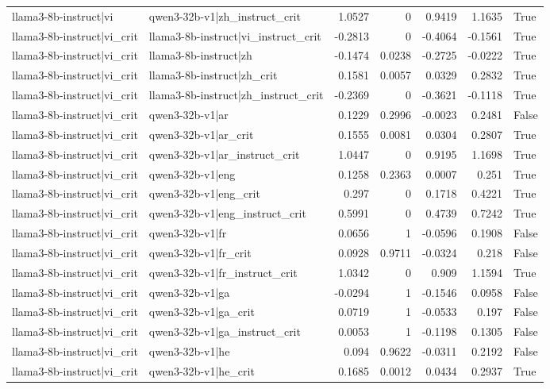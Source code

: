 \begin{table}
\begin{tabular}{l l r r r r l}
llama3-8b-instruct|vi & qwen3-32b-v1|zh_instruct_crit & 1.0527 & 0 & 0.9419 & 1.1635 & True \\
llama3-8b-instruct|vi_crit & llama3-8b-instruct|vi_instruct_crit & -0.2813 & 0 & -0.4064 & -0.1561 & True \\
llama3-8b-instruct|vi_crit & llama3-8b-instruct|zh & -0.1474 & 0.0238 & -0.2725 & -0.0222 & True \\
llama3-8b-instruct|vi_crit & llama3-8b-instruct|zh_crit & 0.1581 & 0.0057 & 0.0329 & 0.2832 & True \\
llama3-8b-instruct|vi_crit & llama3-8b-instruct|zh_instruct_crit & -0.2369 & 0 & -0.3621 & -0.1118 & True \\
llama3-8b-instruct|vi_crit & qwen3-32b-v1|ar & 0.1229 & 0.2996 & -0.0023 & 0.2481 & False \\
llama3-8b-instruct|vi_crit & qwen3-32b-v1|ar_crit & 0.1555 & 0.0081 & 0.0304 & 0.2807 & True \\
llama3-8b-instruct|vi_crit & qwen3-32b-v1|ar_instruct_crit & 1.0447 & 0 & 0.9195 & 1.1698 & True \\
llama3-8b-instruct|vi_crit & qwen3-32b-v1|eng & 0.1258 & 0.2363 & 0.0007 & 0.251 & True \\
llama3-8b-instruct|vi_crit & qwen3-32b-v1|eng_crit & 0.297 & 0 & 0.1718 & 0.4221 & True \\
llama3-8b-instruct|vi_crit & qwen3-32b-v1|eng_instruct_crit & 0.5991 & 0 & 0.4739 & 0.7242 & True \\
llama3-8b-instruct|vi_crit & qwen3-32b-v1|fr & 0.0656 & 1 & -0.0596 & 0.1908 & False \\
llama3-8b-instruct|vi_crit & qwen3-32b-v1|fr_crit & 0.0928 & 0.9711 & -0.0324 & 0.218 & False \\
llama3-8b-instruct|vi_crit & qwen3-32b-v1|fr_instruct_crit & 1.0342 & 0 & 0.909 & 1.1594 & True \\
llama3-8b-instruct|vi_crit & qwen3-32b-v1|ga & -0.0294 & 1 & -0.1546 & 0.0958 & False \\
llama3-8b-instruct|vi_crit & qwen3-32b-v1|ga_crit & 0.0719 & 1 & -0.0533 & 0.197 & False \\
llama3-8b-instruct|vi_crit & qwen3-32b-v1|ga_instruct_crit & 0.0053 & 1 & -0.1198 & 0.1305 & False \\
llama3-8b-instruct|vi_crit & qwen3-32b-v1|he & 0.094 & 0.9622 & -0.0311 & 0.2192 & False \\
llama3-8b-instruct|vi_crit & qwen3-32b-v1|he_crit & 0.1685 & 0.0012 & 0.0434 & 0.2937 & True \\

\end{tabular}
\end{table}
